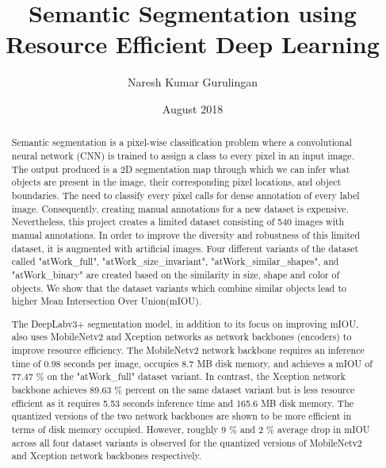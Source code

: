 \documentclass[rnd]{mas_report}
\author{Naresh Kumar Gurulingan}
\title{Semantic Segmentation using Resource Efficient Deep Learning}
\date{August 2018}
\begin{document}
\begin{titlepage}
    \maketitle
\end{titlepage}


\pagestyle{plain}


\cleardoublepage
\statementpage

\begin{abstract}
Semantic segmentation is a pixel-wise classification problem where a convolutional neural network (CNN) is trained to assign a class to every pixel in an input image. The output produced is a 2D segmentation map through which we can infer what objects are present in the image, their corresponding pixel locations, and object boundaries. The need to classify every pixel calls for dense annotation of every label image. Consequently, creating manual annotations for a new dataset is expensive. Nevertheless, this project creates a limited dataset consisting of 540 images with manual annotations. In order to improve the diversity and robustness of this limited dataset, it is augmented with artificial images. Four different variants of the dataset called "atWork\_full", "atWork\_size\_invariant", "atWork\_similar\_shapes", and "atWork\_binary" are created based on the similarity in size, shape and color of objects. We show that the dataset variants which combine similar objects lead to higher Mean Intersection Over Union(mIOU). 

The DeepLabv3+ segmentation model, in addition to its focus on improving mIOU, also uses MobileNetv2 and Xception networks as network backbones (encoders) to improve resource efficiency. The MobileNetv2 network backbone requires an inference time of 0.98 seconds per image, occupies 8.7 MB disk memory, and achieves a mIOU of 77.47 \% on the "atWork\_full" dataset variant. In contrast, the Xception network backbone achieves 89.63 \% percent on the same dataset variant but is less resource efficient as it requires 5.53 seconds inference time and 165.6 MB disk memory. The quantized versions of the two network backbones are shown to be more efficient in terms of disk memory occupied. However, roughly 9 \% and 2 \% average drop in mIOU across all four dataset variants is observed for the quantized versions of MobileNetv2 and Xception network backbones respectively.
\end{abstract}
\end{document}
